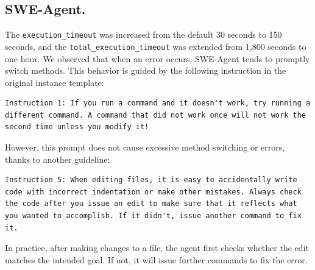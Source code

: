 \begin{table}[htbp]
\centering
\renewcommand{\arraystretch}{1.2}
\caption{Performance variation of OpenHands (GPT-4o) under different hyperparameter settings.}
\label{tab:openhands-gpt4o-hyperparam}
\end{table}



\subsection*{SWE-Agent.}
The \texttt{execution\_timeout} was increased from the default 30 seconds to 150 seconds, and the \texttt{total\_execution\_timeout} was extended from 1,800 seconds to one hour. We observed that when an error occurs, SWE-Agent tends to promptly switch methods. This behavior is guided by the following instruction in the original instance template:
\begin{lstlisting}
Instruction 1: If you run a command and it doesn't work, try running a different command. A command that did not work once will not work the second time unless you modify it!
\end{lstlisting}
However, this prompt does not cause excessive method switching or errors, thanks to another guideline:
\begin{lstlisting}
Instruction 5: When editing files, it is easy to accidentally write code with incorrect indentation or make other mistakes. Always check the code after you issue an edit to make sure that it reflects what you wanted to accomplish. If it didn't, issue another command to fix it.
\end{lstlisting}
In practice, after making changes to a file, the agent first checks whether the edit matches the intended goal. If not, it will issue further commands to fix the error. 

